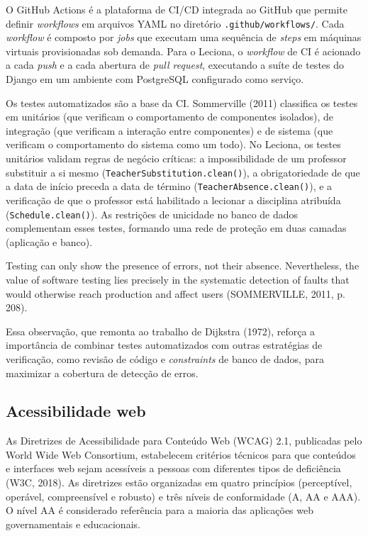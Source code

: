 O GitHub Actions é a plataforma de CI/CD integrada ao GitHub que permite definir \textit{workflows} em arquivos YAML no diretório \texttt{.github/workflows/}. Cada \textit{workflow} é composto por \textit{jobs} que executam uma sequência de \textit{steps} em máquinas virtuais provisionadas sob demanda. Para o Leciona, o \textit{workflow} de CI é acionado a cada \textit{push} e a cada abertura de \textit{pull request}, executando a suíte de testes do Django em um ambiente com PostgreSQL configurado como serviço.

Os testes automatizados são a base da CI. Sommerville (2011) classifica os testes em unitários (que verificam o comportamento de componentes isolados), de integração (que verificam a interação entre componentes) e de sistema (que verificam o comportamento do sistema como um todo). No Leciona, os testes unitários validam regras de negócio críticas: a impossibilidade de um professor substituir a si mesmo (\texttt{TeacherSubstitution.clean()}), a obrigatoriedade de que a data de início preceda a data de término (\texttt{TeacherAbsence.clean()}), e a verificação de que o professor está habilitado a lecionar a disciplina atribuída (\texttt{Schedule.clean()}). As restrições de unicidade no banco de dados complementam esses testes, formando uma rede de proteção em duas camadas (aplicação e banco).

\begin{citacao}
Testing can only show the presence of errors, not their absence. Nevertheless, the value of software testing lies precisely in the systematic detection of faults that would otherwise reach production and affect users (SOMMERVILLE, 2011, p. 208).
\end{citacao}

Essa observação, que remonta ao trabalho de Dijkstra (1972), reforça a importância de combinar testes automatizados com outras estratégias de verificação, como revisão de código e \textit{constraints} de banco de dados, para maximizar a cobertura de detecção de erros.

\subsection{Acessibilidade web}

As Diretrizes de Acessibilidade para Conteúdo Web (WCAG) 2.1, publicadas pelo World Wide Web Consortium, estabelecem critérios técnicos para que conteúdos e interfaces web sejam acessíveis a pessoas com diferentes tipos de deficiência (W3C, 2018). As diretrizes estão organizadas em quatro princípios (perceptível, operável, compreensível e robusto) e três níveis de conformidade (A, AA e AAA). O nível AA é considerado referência para a maioria das aplicações web governamentais e educacionais.

